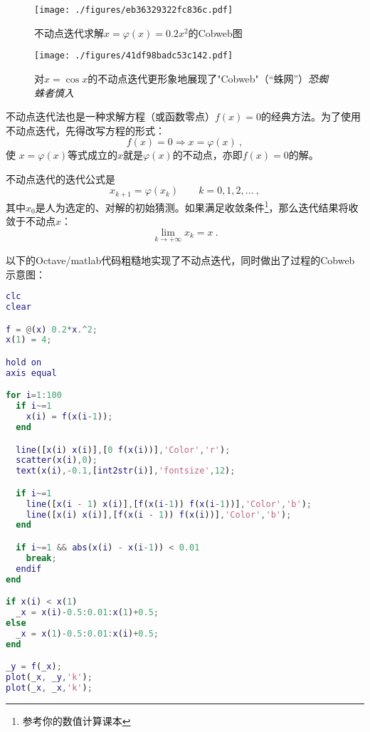 
\begin{figure}[ht]
\centering
\texttt{[image: ./figures/eb36329322fc836c.pdf]}
\caption{不动点迭代求解$x=\varphi(x)=0.2x^2$的Cobweb图} \label{fig_FPIPLT_1}
\end{figure}

\begin{figure}[ht]
\centering
\texttt{[image: ./figures/41df98badc53c142.pdf]}
\caption{对$x=\cos x$的不动点迭代更形象地展现了"Cobweb"（“蛛网”）\textsl{恐蜘蛛者慎入}} \label{fig_FPIPLT_2}
\end{figure}

不动点迭代法也是一种求解方程（或函数零点）$f(x)=0$的经典方法。为了使用不动点迭代，先得改写方程的形式：
\begin{equation}
f(x)=0\Rightarrow x = \varphi(x)~,
\end{equation}
使 $x = \varphi(x)$等式成立的$x$就是$\varphi(x)$的不动点，亦即$f(x)=0$的解。

不动点迭代的迭代公式是
\begin{equation}
x_{k+1} = \varphi(x_k) \qquad k=0,1,2,...~,
\end{equation}
其中$x_0$是人为选定的、对解的初始猜测。如果满足收敛条件\footnote{参考你的数值计算课本}，那么迭代结果将收敛于不动点$x$：
$$\lim_{k\to+\infty} x_k = x~.$$

以下的Octave/matlab代码粗糙地实现了不动点迭代，同时做出了过程的Cobweb示意图：

\begin{lstlisting}[language=matlab]
clc
clear

f = @(x) 0.2*x.^2;
x(1) = 4;

hold on
axis equal

for i=1:100
  if i~=1
    x(i) = f(x(i-1));
  end

  line([x(i) x(i)],[0 f(x(i))],'Color','r');
  scatter(x(i),0);
  text(x(i),-0.1,[int2str(i)],'fontsize',12);

  if i~=1
    line([x(i - 1) x(i)],[f(x(i-1)) f(x(i-1))],'Color','b');
    line([x(i) x(i)],[f(x(i - 1)) f(x(i))],'Color','b');
  end

  if i~=1 && abs(x(i) - x(i-1)) < 0.01
    break;
  endif
end

if x(i) < x(1)
  _x = x(i)-0.5:0.01:x(1)+0.5;
else
  _x = x(1)-0.5:0.01:x(i)+0.5;
end

_y = f(_x);
plot(_x, _y,'k');
plot(_x, _x,'k');
\end{lstlisting}
